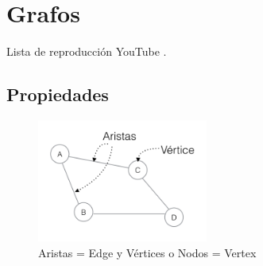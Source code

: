 \documentclass[../main.tex]{subfiles}
\begin{document}
\section{Grafos} 
    Lista de reproducción YouTube \cite{grafos_lista_youtube}.

    \subsection{Propiedades}
    
    \begin{figure}[ht]
        \centering
        \includegraphics[width=0.5\textwidth]{images/grafos/grafo_aristas_vertices.png}
        \caption{Aristas = Edge y Vértices o Nodos = Vertex }
    \end{figure}
\end{document}
